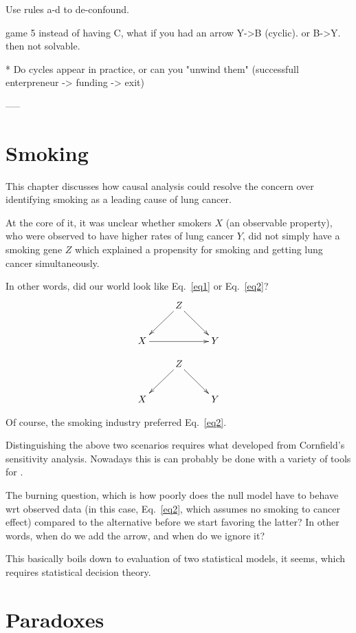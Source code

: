\documentclass{article}
\begin{document}
Use rules a-d to de-confound.

game 5 instead of having C, what if you had an arrow Y->B (cyclic). or B->Y. then not solvable.

* Do cycles appear in practice, or can you "unwind them" (successfull enterpreneur -> funding -> exit)

-----

\section{Smoking}

This chapter discusses how causal analysis could resolve the concern over identifying smoking as a leading cause of lung cancer.

At the core of it, it was unclear whether smokers $X$ (an observable property), who were observed to have higher rates of lung cancer $Y$, did not simply have a smoking gene $Z$ which explained a propensity for smoking and getting lung cancer simultaneously.

In other words, did our world look like Eq.~\ref{eq1} or Eq.~\ref{eq2}?
\begin{align} \label{eq1}
  \xymatrix{
    &Z \ar[dl]\ar[dr]&\\
    X \ar[rr]& & Y
}
\end{align}

\begin{align} \label{eq2}
  \xymatrix{
    &Z \ar[dl]\ar[dr]&\\
    X & & Y
}
\end{align}

Of course, the smoking industry preferred Eq.~\ref{eq2}.

Distinguishing the above two scenarios requires what developed from Cornfield's sensitivity analysis. Nowadays this is can probably be done with a variety of tools for .

The burning question, which is how poorly does the null model have to behave wrt observed data (in this case, Eq.~\ref{eq2}, which assumes no smoking to cancer effect) compared to the alternative before we start favoring the latter? In other words, when do we add the arrow, and when do we ignore it?

This basically boils down to evaluation of two statistical models, it seems, which requires statistical decision theory.

\section{Paradoxes}
\end{document}
